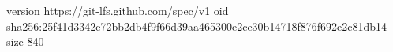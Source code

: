 version https://git-lfs.github.com/spec/v1
oid sha256:25f41d3342e72bb2db4f9f66d39aa465300e2ce30b14718f876f692e2c81db14
size 840
